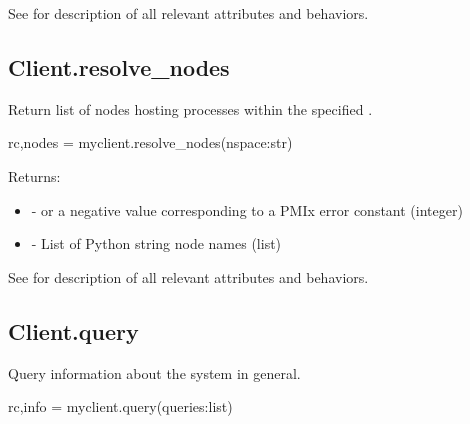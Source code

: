 See  for description of all relevant attributes and behaviors.


\subsection{Client.resolve_nodes}

\summary

Return list of nodes hosting processes within the specified .

\format

\pyspecificstart
\begin{codepar}
rc,nodes = myclient.resolve_nodes(nspace:str)
\end{codepar}
\pyspecificend

\begin{arglist}
\end{arglist}

Returns:

\begin{itemize}
    \item {} -  or a negative value corresponding to a PMIx error constant (integer)
    \item {} - List of Python string node names (list)
\end{itemize}

See  for description of all relevant attributes and behaviors.


\subsection{Client.query}

\summary

Query information about the system in general.

\format

\pyspecificstart
\begin{codepar}
rc,info = myclient.query(queries:list)
\end{codepar}
\pyspecificend

\begin{arglist}
\end{arglist}

